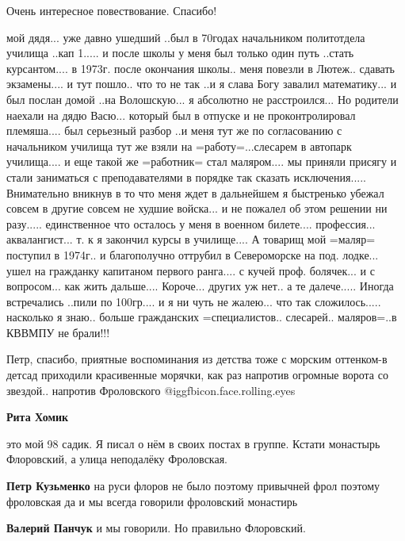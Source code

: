 \begin{itemize}
Очень интересное повествование. Спасибо!


мой дядя... уже давно ушедший ..был в 70годах начальником политотдела училища
..кап 1..... и после школы у меня был только один путь ..стать курсантом.... в
1973г. после окончания школы.. меня повезли в Лютеж.. сдавать экзамены.... и тут
пошло.. что то не так ..и я слава Богу завалил математику... и был послан домой
..на Волошскую... я абсолютно не расстроился... Но родители наехали на дядю
Васю... который был в отпуске и не проконтролировал племяша.... был серьезный
разбор ..и меня тут же по согласованию с начальником училища тут же взяли на
=работу=...слесарем в автопарк училища.... и еще такой же =работник= стал
маляром.... мы приняли присягу и стали заниматься с преподавателями в порядке
так сказать исключения..... Внимательно вникнув в то что меня ждет в дальнейшем
я быстренько убежал совсем в другие совсем не худшие войска... и не пожалел об
этом решении ни разу..... единственное что осталось у меня в военном
билете.... профессия... аквалангист... т. к я закончил курсы в училище.... А товарищ
мой =маляр= поступил в 1974г.. и благополучно оттрубил в Североморске на
под. лодке... ушел на гражданку капитаном первого ранга.... с кучей
проф. болячек... и с вопросом... как жить дальше.... Короче... других уж нет.. а те
далече..... Иногда встречались ..пили по 100гр.... и я ни чуть не жалею... что так
сложилось..... насколько я знаю.. больше гражданских
=специалистов.. слесарей.. маляров=..в КВВМПУ не брали!!!


Петр, спасибо, приятные воспоминания из детства тоже с морским оттенком-в детсад
приходили красивенные морячки, как раз напротив огромные ворота со
звездой.. напротив Фроловского @igg{fbicon.face.rolling.eyes} 

\begin{itemize} %
\textbf{Рита Хомик} 

это мой 98 садик. Я писал о нём в своих постах в группе. Кстати монастырь
Флоровский, а улица неподалёку Фроловская.

\begin{itemize} %
\textbf{Петр Кузьменко} на руси флоров не было поэтому привычней фрол поэтому фроловская да и мы всегда говорили фроловский монастирь

\textbf{Валерий Панчук} и мы говорили. Но правильно Флоровский.
\end{itemize} %


\end{itemize}
\end{itemize}
